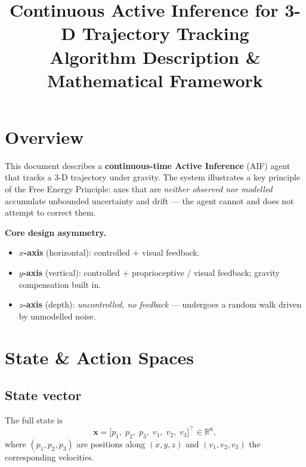 \documentclass[11pt, a4paper]{article}
\title{%
  \textbf{\Large Continuous Active Inference for 3-D Trajectory Tracking}\\[4pt]
  \large Algorithm Description \& Mathematical Framework
}
\author{}
\date{}
\newcommand{\vect}[1]{\bm{#1}}
\begin{document}
\maketitle
\thispagestyle{empty}
\vspace{-1em}
\tableofcontents
\newpage

\section{Overview}

This document describes a \textbf{continuous-time Active Inference} (AIF) agent
that tracks a 3-D trajectory under gravity. The system illustrates a key
principle of the Free Energy Principle: axes that are \emph{neither observed nor
modelled} accumulate unbounded uncertainty and drift --- the agent cannot and
does not attempt to correct them.

\begin{keybox}
\textbf{Core design asymmetry.}
\begin{itemize}[noitemsep]
  \item \textbf{$x$-axis} (horizontal): controlled $+$ visual feedback.
  \item \textbf{$y$-axis} (vertical): controlled $+$ proprioceptive / visual feedback;
        gravity compensation built in.
  \item \textbf{$z$-axis} (depth): \emph{uncontrolled, no feedback} --- undergoes
        a random walk driven by unmodelled noise.
\end{itemize}
\end{keybox}

\section{State \& Action Spaces}

\subsection{State vector}
The full state is
\begin{equation}
  \vect{x} = \bigl[p_1,\; p_2,\; p_3,\; v_1,\; v_2,\; v_3\bigr]^\top \in \mathbb{R}^6,
\end{equation}
where $(p_1, p_2, p_3)$ are positions along $(x, y, z)$ and
$(v_1, v_2, v_3)$ the corresponding velocities.
\end{document}

